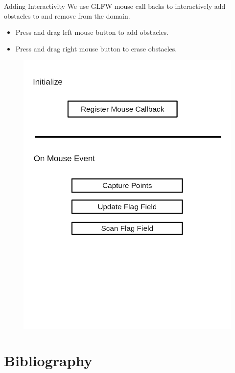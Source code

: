 \documentclass[9pt]{beamer}
\begin{document}
\begin{frame}{Adding Interactivity}
We use GLFW mouse call backs to interactively add obstacles to and remove from the domain. 
\begin{itemize}
	\item Press and drag left mouse button to add obstacles. 
    \item Press and drag right mouse button to erase obstacles. 
\end{itemize}

\pause

\begin{figure}
\begin{center}
	\includegraphics[scale=0.2]{images/mouse_call_backs.png}
\end{center}
\end{figure}
\end{frame}



\section{Bibliography}
\end{document}
